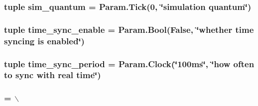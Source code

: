 \label{classRoot_1_1Root_a63a02cfa137741181a2af17e02bcea9b}
\hypertarget{classRoot_1_1Root_a8b89da90280368eb70b1dcdc80b7bcff}{
\subsubsection[{sim\_\-quantum}]{\setlength{\rightskip}{0pt plus 5cm}tuple {\bf sim\_\-quantum} = {\bf Param.Tick}(0, \char`\"{}simulation quantum\char`\"{})}}
\label{classRoot_1_1Root_a8b89da90280368eb70b1dcdc80b7bcff}
\hypertarget{classRoot_1_1Root_a4b2627ca12c207b2264371b86283ee16}{
\subsubsection[{time\_\-sync\_\-enable}]{\setlength{\rightskip}{0pt plus 5cm}tuple {\bf time\_\-sync\_\-enable} = Param.Bool(False, \char`\"{}whether time syncing is enabled\char`\"{})}}
\label{classRoot_1_1Root_a4b2627ca12c207b2264371b86283ee16}
\hypertarget{classRoot_1_1Root_ac83b50be6a4c522df2c3c2c0e3e30fc0}{
\subsubsection[{time\_\-sync\_\-period}]{\setlength{\rightskip}{0pt plus 5cm}tuple {\bf time\_\-sync\_\-period} = Param.Clock(\char`\"{}100ms\char`\"{}, \char`\"{}how often to sync with real time\char`\"{})}}
\label{classRoot_1_1Root_ac83b50be6a4c522df2c3c2c0e3e30fc0}
\hypertarget{classRoot_1_1Root_a8645bacb1accc24cced37b66213d5a10}{
\subsubsection[{time\_\-sync\_\-spin\_\-threshold}]{ = $\backslash$}}
